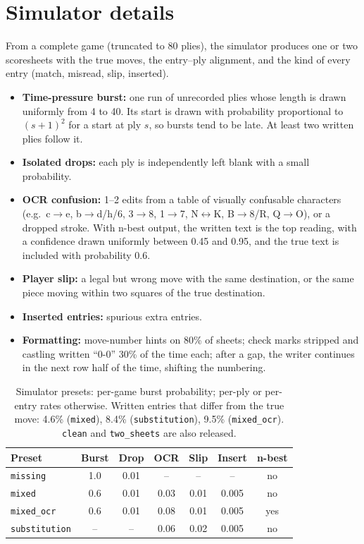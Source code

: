 \documentclass[11pt]{article}
\begin{document}
\section{Simulator details}
\label{app:sim}
From a complete game (truncated to 80 plies), the simulator produces one or two scoresheets with the true moves, the entry--ply alignment, and the kind of every entry (match, misread, slip, inserted).
\begin{itemize}
  \item \textbf{Time-pressure burst:} one run of unrecorded plies whose length is drawn uniformly from 4 to 40. Its start is drawn with probability proportional to $(s+1)^2$ for a start at ply $s$, so bursts tend to be late. At least two written plies follow it.
  \item \textbf{Isolated drops:} each ply is independently left blank with a small probability.
  \item \textbf{OCR confusion:} 1--2 edits from a table of visually confusable characters (e.g.\ c$\to$e, b$\to$d/h/6, 3$\to$8, 1$\to$7, N$\leftrightarrow$K, B$\to$8/R, Q$\to$O), or a dropped stroke. With n-best output, the written text is the top reading, with a confidence drawn uniformly between 0.45 and 0.95, and the true text is included with probability 0.6.
  \item \textbf{Player slip:} a legal but wrong move with the same destination, or the same piece moving within two squares of the true destination.
  \item \textbf{Inserted entries:} spurious extra entries.
  \item \textbf{Formatting:} move-number hints on 80\% of sheets; check marks stripped and castling written ``0-0'' 30\% of the time each; after a gap, the writer continues in the next row half of the time, shifting the numbering.
\end{itemize}
\begin{table}[h]
\centering\small
\begin{tabular}{lcccccc}
\toprule
Preset & Burst & Drop & OCR & Slip & Insert & n-best \\
\midrule
\texttt{missing} & 1.0 & 0.01 & -- & -- & -- & no \\
\texttt{mixed} & 0.6 & 0.01 & 0.03 & 0.01 & 0.005 & no \\
\texttt{mixed\_ocr} & 0.6 & 0.01 & 0.08 & 0.01 & 0.005 & yes \\
\texttt{substitution} & -- & -- & 0.06 & 0.02 & 0.005 & no \\
\bottomrule
\end{tabular}
\caption{Simulator presets: per-game burst probability; per-ply or per-entry rates otherwise. Written entries that differ from the true move: 4.6\% (\texttt{mixed}), 8.4\% (\texttt{substitution}), 9.5\% (\texttt{mixed\_ocr}). \texttt{clean} and \texttt{two\_sheets} are also released.}
\label{tab:presets}
\end{table}
\end{document}
